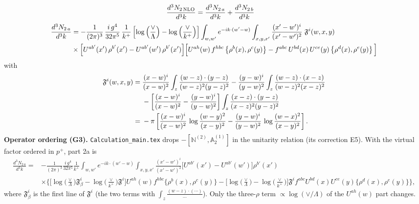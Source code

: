 \documentclass[9pt]{article}
\numberwithin{equation}{section}
\begin{document}
\begin{align}
\frac{d^{3}N_{2\,\rm NLO}}{d^{3}k} &= \frac{d^{3}N_{2\,a}}{d^{3}k} + \frac{d^{3}N_{2\,b}}{d^{3}k}
\end{align}
\begin{align}
\frac{d^{3}N_{2\,a}}{d^{3}k} & = -\frac{1}{(2\pi)^{3}}\,\frac{i\,g^{4}}{32\pi^{5}}\,\frac{1}{k^{+}}
\left[\log\left(\frac{\vee}{\Lambda}\right)-\log\left(\frac{\vee}{k^{+}}\right)\right]
\int_{w,w'} e^{-ik\cdot(w'-w)}\int_{x,y,x'}\frac{(x'-w')^{i}}{(x'-w')^{2}}\;\mathfrak{F}^{i}(w,x,y)\notag\\
&\times\Big[U^{ab'}(x')\,\rho^{b'}(x')-U^{ab'}(w')\,\rho^{b'}(x')\Big]
\Big[U^{ah}(w)\,f^{hbc}\left\{\rho^{b}(x),\rho^{c}(y)\right\}-f^{abc}\,U^{bd}(x)\,U^{ce}(y)\left\{\rho^{d}(x),\rho^{e}(y)\right\}\Big]
\end{align}
with
\begin{align}
\mathfrak{F}^{i}(w,x,y) ={}& \frac{(x-w)^{i}}{(x-w)^{2}}\int_{z}\frac{(w-z)\cdot(y-z)}{(w-z)^{2}(y-z)^{2}}
-\frac{(y-w)^{i}}{(y-w)^{2}}\int_{z}\frac{(w-z)\cdot(x-z)}{(w-z)^{2}(x-z)^{2}}\notag\\
&-\left[\frac{(x-w)^{i}}{(x-w)^{2}}-\frac{(y-w)^{i}}{(y-w)^{2}}\right]\int_{z}\frac{(x-z)\cdot(y-z)}{(x-z)^{2}(y-z)^{2}}\\
={}& -\pi\left[\frac{(x-w)^{i}}{(x-w)^{2}}\,\log\frac{(w-y)^{2}}{(x-y)^{2}}-\frac{(y-w)^{i}}{(y-w)^{2}}\,\log\frac{(w-x)^{2}}{(x-y)^{2}}\right].
\end{align}
\begingroup\color{blue}\noindent\textbf{Operator ordering (G3).} \texttt{Calculation\_main.tex} drops $-[\mathbb{N}^{(2)},\mathbb{A}^{(1)}_{2}]$ in the unitarity relation (its correction E5). With the virtual factor ordered in $p^{+}$, part 2a is
\begin{align*}
\frac{d^{3}N_{2\,a}}{d^{3}k}={}&-\frac{1}{(2\pi)^{3}}\frac{i\,g^{4}}{32\pi^{5}}\frac{1}{k^{+}}\int_{w,w'}e^{-ik\cdot(w'-w)}\int_{x,y,x'}\frac{(x'-w')^{i}}{(x'-w')^{2}}\Big[U^{ab'}(x')-U^{ab'}(w')\Big]\rho^{b'}(x')\\
&\times\Big\{\Big[\log\Big(\frac{\vee}{\Lambda}\Big)\mathfrak{F}^{i}_{\beta}-\log\Big(\frac{\vee}{k^{+}}\Big)\mathfrak{F}^{i}\Big]U^{ah}(w)f^{hbc}\{\rho^{b}(x),\rho^{c}(y)\}-\Big[\log\Big(\frac{\vee}{\Lambda}\Big)-\log\Big(\frac{\vee}{k^{+}}\Big)\Big]\mathfrak{F}^{i}f^{abc}U^{bd}(x)U^{ce}(y)\{\rho^{d}(x),\rho^{e}(y)\}\Big\},
\end{align*}
where $\mathfrak{F}^{i}_{\beta}$ is the first line of $\mathfrak{F}^{i}$ (the two terms with $\int_{z}\frac{(w-z)\cdot(\cdots)}{\cdots}$). Only the three-$\rho$ term $\propto\log(\vee/\Lambda)$ of the $U^{ah}(w)$ part changes.\par\endgroup
\end{document}
